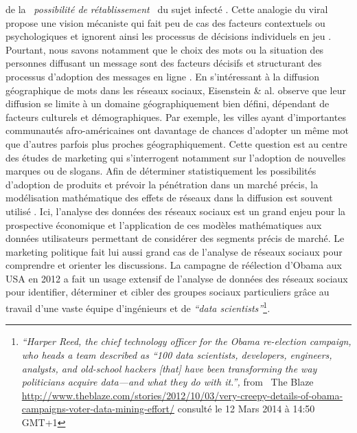 de la \textit{{\guillemotleft}~possibilit\'e de
}\textit{r\'etablissement~{\guillemotright} }du sujet infect\'e \cite{Wang2011}. Cette analogie du viral propose une vision
m\'ecaniste qui fait peu de cas des facteurs contextuels ou
psychologiques et ignorent ainsi les processus de d\'ecisions
individuels en jeu \cite{Jackson2010}. Pourtant, nous savons
notamment que le choix des mots ou la situation des personnes diffusant
un message sont des facteurs d\'ecisifs et structurant des processus
d{\textquoteright}adoption des messages en ligne \cite{Conover2013}. 
En s{\textquoteright}int\'eressant \`a la diffusion
g\'eographique de mots dans les r\'eseaux sociaux, Eisenstein \& al.
\cite{Eisenstein2012} observe que leur diffusion se limite \`a un domaine
g\'eographiquement bien d\'efini, d\'ependant de facteurs culturels et
d\'emographiques. Par exemple, les villes ayant
d{\textquoteright}importantes communaut\'es afro-am\'ericaines ont
davantage de chances d{\textquoteright}adopter un m\^eme mot que
d{\textquoteright}autres parfois plus proches g\'eographiquement. Cette
question est au centre des \'etudes de marketing qui
s{\textquoteright}interrogent notamment sur l{\textquoteright}adoption
de nouvelles marques ou de slogans. Afin de d\'eterminer
statistiquement les possibilit\'es d{\textquoteright}adoption de
produits et pr\'evoir la p\'en\'etration dans un march\'e pr\'ecis, la
mod\'elisation math\'ematique des effets de r\'eseaux dans la diffusion
est souvent utilis\'e \cite{Bass1994}. Ici,
l{\textquoteright}analyse des donn\'ees des r\'eseaux sociaux est un
grand enjeu pour la prospective \'economique et
l{\textquoteright}application de ces mod\`eles math\'ematiques aux
donn\'ees utilisateurs permettant de consid\'erer des segments pr\'ecis
de march\'e. Le marketing politique fait lui aussi grand cas de
l{\textquoteright}analyse de r\'eseaux sociaux pour comprendre et
orienter les discussions. La campagne de r\'e\'election
d{\textquoteright}Obama aux USA en 2012 a fait un usage extensif de
l{\textquoteright}analyse de donn\'ees des r\'eseaux sociaux pour
identifier, d\'eterminer et cibler des groupes sociaux particuliers
gr\^ace au travail d{\textquoteright}une vaste \'equipe
d{\textquoteright}ing\'enieurs et de \textit{{\textquotedblleft}data
scientists{\textquotedblright}}\footnote{
\textit{{\textquotedblleft}Harper Reed, the chief technology officer
for the Obama re-election campaign, who heads a team described as
{\textquotedblleft}100 data scientists, developers, engineers,
analysts, and old-school hackers [that] have been transforming the way
politicians acquire data---and what they do with
it.{\textquotedblright}, }from \ The Blaze
\url{http://www.theblaze.com/stories/2012/10/03/very-creepy-details-of-obama-campaigns-voter-data-mining-effort/}
consult\'e le 12 Mars 2014 \`a 14:50 GMT+1}\textit{. }

